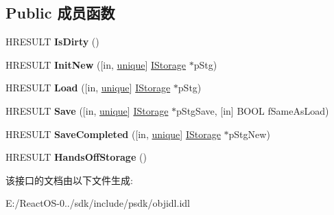 \subsection*{Public 成员函数}
\begin{DoxyCompactItemize}
\item 
\mbox{\label{interface_i_persist_storage_a43c9a006bc9fd2d1bf327c9a5d7e5bc1}} 
H\+R\+E\+S\+U\+LT {\bfseries Is\+Dirty} ()
\item 
\mbox{\label{interface_i_persist_storage_a83618d9d0f1323c5b0e385944277db18}} 
H\+R\+E\+S\+U\+LT {\bfseries Init\+New} (\mbox{[}in, \hyperlink{interfaceunique}{unique}\mbox{]} \hyperlink{interface_i_storage}{I\+Storage} $\ast$p\+Stg)
\item 
\mbox{\label{interface_i_persist_storage_ac0181d7c08562b650df858b975d1890b}} 
H\+R\+E\+S\+U\+LT {\bfseries Load} (\mbox{[}in, \hyperlink{interfaceunique}{unique}\mbox{]} \hyperlink{interface_i_storage}{I\+Storage} $\ast$p\+Stg)
\item 
\mbox{\label{interface_i_persist_storage_a5ec4672c8ef3914ad834280afb411f7c}} 
H\+R\+E\+S\+U\+LT {\bfseries Save} (\mbox{[}in, \hyperlink{interfaceunique}{unique}\mbox{]} \hyperlink{interface_i_storage}{I\+Storage} $\ast$p\+Stg\+Save, \mbox{[}in\mbox{]} B\+O\+OL f\+Same\+As\+Load)
\item 
\mbox{\label{interface_i_persist_storage_a6ea7035cff5cc6705ba77d47d19644d2}} 
H\+R\+E\+S\+U\+LT {\bfseries Save\+Completed} (\mbox{[}in, \hyperlink{interfaceunique}{unique}\mbox{]} \hyperlink{interface_i_storage}{I\+Storage} $\ast$p\+Stg\+New)
\item 
\mbox{\label{interface_i_persist_storage_a0274c3d8e68c9357a66220bad98e101a}} 
H\+R\+E\+S\+U\+LT {\bfseries Hands\+Off\+Storage} ()
\end{DoxyCompactItemize}


该接口的文档由以下文件生成\+:\begin{DoxyCompactItemize}
\item 
E\+:/\+React\+O\+S-\/0../sdk/include/psdk/objidl.\+idl\end{DoxyCompactItemize}
